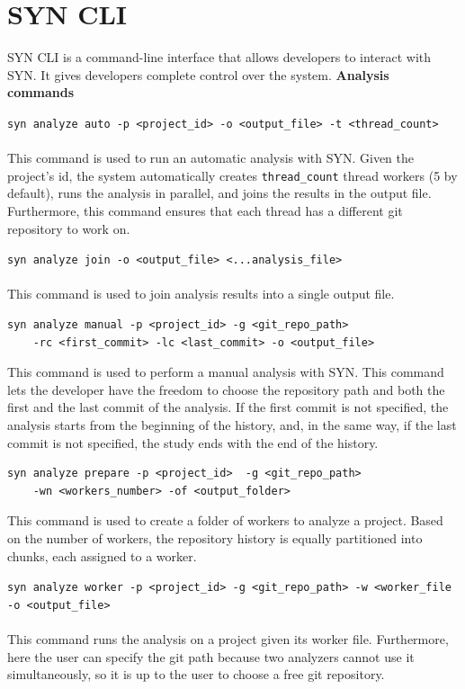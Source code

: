 \section{SYN CLI}
SYN CLI is a command-line interface that allows developers to interact with SYN. It gives developers complete control over the system.
\bigbreak
\textbf{Analysis commands}
\bigbreak

\lstinline{syn analyze auto -p <project_id> -o <output_file> -t <thread_count>}\\
\\
This command is used to run an automatic analysis with SYN. 
Given the project's id, the system automatically creates \texttt{thread\_count} thread workers (5 by default), runs the analysis in parallel, and joins the results in the output file. 
Furthermore, this command ensures that each thread has a different git repository to work on. 
\bigbreak

\lstinline{syn analyze join -o <output_file> <...analysis_file>}\\
\\
This command is used to join analysis results into a single output file.
\bigbreak
\begin{lstlisting}
syn analyze manual -p <project_id> -g <git_repo_path>
    -rc <first_commit> -lc <last_commit> -o <output_file>
\end{lstlisting}
\bigbreak
This command is used to perform a manual analysis with SYN. This command lets the developer have the freedom to choose the repository path and both the first and the last commit of the analysis. 
If the first commit is not specified, the analysis starts from the beginning of the history, and, in the same way, if the last commit is not specified, the study ends with the end of the history. 
\bigbreak

\begin{lstlisting}
syn analyze prepare -p <project_id>  -g <git_repo_path> 
    -wn <workers_number> -of <output_folder>
\end{lstlisting}
\bigbreak
This command is used to create a folder of workers to analyze a project.
Based on the number of workers, the repository history is equally partitioned into chunks, each assigned to a worker. 
\bigbreak

\lstinline{syn analyze worker -p <project_id> -g <git_repo_path> -w <worker_file -o <output_file>}\\
\\
This command runs the analysis on a project given its worker file. 
Furthermore, here the user can specify the git path because two analyzers cannot use it simultaneously, so it is up to the user to choose a free git repository. 

